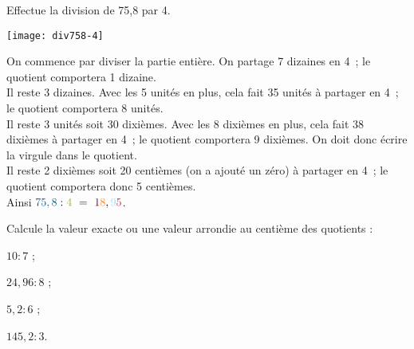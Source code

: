 \begin{methode*1}

\begin{exemple*1}
Effectue la division de 75,8 par 4.\\[0.5em]

\begin{minipage}[c]{.26\textwidth}
\vspace{0em}
\begin{center}\texttt{[image: div758-4]} \end{center}

\end{minipage}\hfill%
\begin{minipage}[c]{.66\textwidth}

On commence par diviser la partie entière. On partage \textcolor{A1}{7} dizaines en \textcolor{H1}{4} ; le quotient comportera \textcolor{C1}{1} dizaine.\\[0.75em]
Il reste 3 dizaines. Avec les \textcolor{A1}{5} unités en plus, cela fait 35 unités à partager en \textcolor{H1}{4} ; le quotient comportera \textcolor{J1}{8} unités. \\[0.75em]
Il reste 3 unités soit 30 dixièmes. Avec les \textcolor{A1}{8} dixièmes en plus, cela fait 38 dixièmes à partager en \textcolor{H1}{4} ; le quotient comportera \textcolor{A3}{9} dixièmes. On doit donc écrire la virgule dans le quotient.\\[0.75em]
Il reste 2 dixièmes soit 20 centièmes (on a ajouté un zéro) à partager en \textcolor{H1}{4} ; le quotient comportera donc \textcolor{B2}{5} centièmes.\\[0.75em]
Ainsi $\textcolor{A1}{75,8} : \textcolor{H1}{4} = \textcolor{C1}{1}\textcolor{J1}{8},\textcolor{A3}{9}\textcolor{B2}{5}$.
\end{minipage}

\end{exemple*1}

\exercice
Calcule la valeur exacte ou une valeur arrondie au centième des quotients :
\begin{colenumerate}{4}
 \item $10 : 7$ ;
 \item $24,96 : 8$ ;
 \item $5,2 : 6$ ;
 \item $145,2 : 3$.
 \end{colenumerate}

\end{methode*1}

